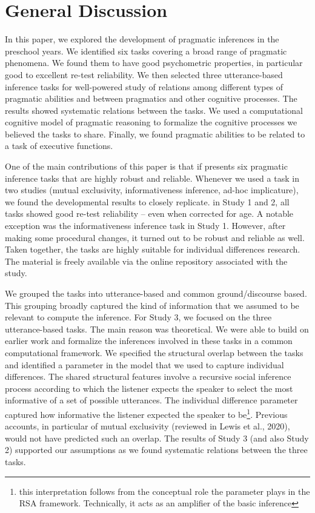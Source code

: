 \documentclass[
  english,
  man,floatsintext]{apa6}
\begin{document}
\hypertarget{general-discussion}{%
\section{General Discussion}\label{general-discussion}}

In this paper, we explored the development of pragmatic inferences in the preschool years. We identified six tasks covering a broad range of pragmatic phenomena. We found them to have good psychometric properties, in particular good to excellent re-test reliability. We then selected three utterance-based inference tasks for well-powered study of relations among different types of pragmatic abilities and between pragmatics and other cognitive processes. The results showed systematic relations between the tasks. We used a computational cognitive model of pragmatic reasoning to formalize the cognitive processes we believed the tasks to share. Finally, we found pragmatic abilities to be related to a task of executive functions.

One of the main contributions of this paper is that if presents six pragmatic inference tasks that are highly robust and reliable. Whenever we used a task in two studies (mutual exclusivity, informativeness inference, ad-hoc implicature), we found the developmental results to closely replicate. in Study 1 and 2, all tasks showed good re-test reliability -- even when corrected for age. A notable exception was the informativeness inference task in Study 1. However, after making some procedural changes, it turned out to be robust and reliable as well. Taken together, the tasks are highly suitable for individual differences research. The material is freely available via the online repository associated with the study.

We grouped the tasks into utterance-based and common ground/discourse based. This grouping broadly captured the kind of information that we assumed to be relevant to compute the inference. For Study 3, we focused on the three utterance-based tasks. The main reason was theoretical. We were able to build on earlier work and formalize the inferences involved in these tasks in a common computational framework. We specified the structural overlap between the tasks and identified a parameter in the model that we used to capture individual differences. The shared structural features involve a recursive social inference process according to which the listener expects the speaker to select the most informative of a set of possible utterances. The individual difference parameter captured how informative the listener expected the speaker to be\footnote{this interpretation follows from the conceptual role the parameter plays in the RSA framework. Technically, it acts as an amplifier of the basic inference}. Previous accounts, in particular of mutual exclusivity (reviewed in Lewis et al., 2020), would not have predicted such an overlap. The results of Study 3 (and also Study 2) supported our assumptions as we found systematic relations between the three tasks.
\end{document}
